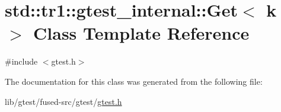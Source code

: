 \hypertarget{classstd_1_1tr1_1_1gtest__internal_1_1_get}{\section{std\-:\-:tr1\-:\-:gtest\-\_\-internal\-:\-:Get$<$ k $>$ Class Template Reference}
\label{classstd_1_1tr1_1_1gtest__internal_1_1_get}
}


{\ttfamily \#include $<$gtest.\-h$>$}



The documentation for this class was generated from the following file\-:\begin{DoxyCompactItemize}
\item 
lib/gtest/fused-\/src/gtest/\hyperlink{fused-src_2gtest_2gtest_8h}{gtest.\-h}\end{DoxyCompactItemize}
